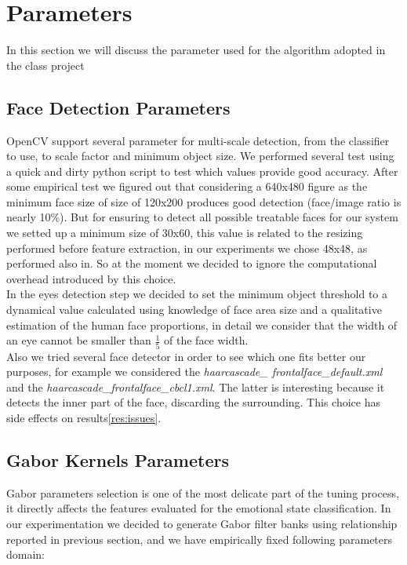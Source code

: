 \section{Parameters}

In this section we will discuss the parameter used for the algorithm adopted in the class project

\subsection{Face Detection Parameters}

OpenCV support several parameter for multi-scale detection, from the classifier to use, to scale factor and minimum object size. We performed several test using a quick and dirty python script to test which values provide good accuracy. After some empirical test we figured out that considering a 640x480 figure as the minimum face size of size of 120x200 produces good detection (face/image ratio is nearly 10\%). But for ensuring to detect all possible treatable faces for our system we setted up a minimum size of 30x60, this value is related to the resizing performed before feature extraction, in our experiments we chose 48x48, as performed also in\cite{Littlewort04dynamicsof}. So at the moment we decided to ignore the computational overhead introduced by this choice. \\

In the eyes detection step we decided to set the minimum object threshold to a dynamical value calculated using knowledge of face area size and a qualitative estimation of the human face proportions, in detail we consider that the width of an eye cannot be smaller than $\frac{1}{5}$ of the face width.\\

Also we tried several face detector in order to see which one fits better our purposes, for example we considered the \emph{haarcascade\_ frontalface\_default.xml} and the \emph{haarcascade\_frontalface\_cbcl1.xml}. The latter is interesting because it detects the inner part of the face, discarding the surrounding. This choice has side effects on results\ref{res:issues}.

\subsection{Gabor Kernels Parameters}

Gabor parameters selection is one of the most delicate part of the tuning process, it directly affects the features evaluated for the emotional state classification. 
In our experimentation we decided to generate Gabor filter banks using relationship reported in previous section, and we have empirically fixed following parameters domain:

